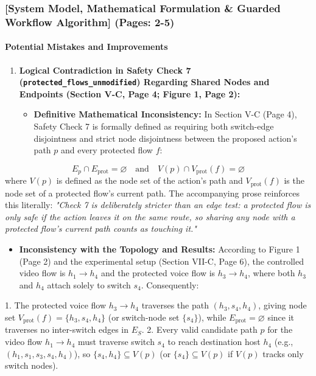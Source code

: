 \documentclass[11pt,a4paper]{article}
\begin{document}
\subsubsection*{[System Model, Mathematical Formulation \& Guarded Workflow Algorithm] (Pages: 2-5)}
\paragraph{Potential Mistakes and Improvements}
\begin{enumerate}[leftmargin=1.6em,itemsep=3pt]
\item \textbf{Logical Contradiction in Safety Check 7 (\texttt{protected\_flows\_unmodified}) Regarding Shared Nodes and Endpoints (Section V-C, Page 4; Figure 1, Page 2):}
\begin{itemize}[leftmargin=1.8em,itemsep=2pt]
\item \textbf{Definitive Mathematical Inconsistency:} In Section V-C (Page 4), Safety Check 7 is formally defined as requiring both switch-edge disjointness and strict node disjointness between the proposed action's path $p$ and every protected flow $f$:
\end{itemize}
\end{enumerate}
$$E_p \cap E_{\text{prot}} = \varnothing \quad \text{and} \quad V(p) \cap V_{\text{prot}}(f) = \varnothing$$
where $V(p)$ is defined as the node set of the action's path and $V_{\text{prot}}(f)$ is the node set of a protected flow's current path. The accompanying prose reinforces this literally: \emph{"Check 7 is deliberately stricter than an edge test: a protected flow is only safe if the action leaves it on the same route, so sharing any node with a protected flow's current path counts as touching it."}
\begin{itemize}[leftmargin=1.8em,itemsep=2pt]
\item \textbf{Inconsistency with the Topology and Results:} According to Figure 1 (Page 2) and the experimental setup (Section VII-C, Page 6), the controlled video flow is $h_1 \to h_4$ and the protected voice flow is $h_3 \to h_4$, where both $h_3$ and $h_4$ attach solely to switch $s_4$. Consequently:
\end{itemize}
1. The protected voice flow $h_3 \to h_4$ traverses the path $(h_3, s_4, h_4)$, giving node set $V_{\text{prot}}(f) = \{h_3, s_4, h_4\}$ (or switch-node set $\{s_4\}$), while $E_{\text{prot}} = \varnothing$ since it traverses no inter-switch edges in $E_S$.
2. Every valid candidate path $p$ for the video flow $h_1 \to h_4$ must traverse switch $s_4$ to reach destination host $h_4$ (e.g., $(h_1, s_1, s_3, s_4, h_4)$), so $\{s_4, h_4\} \subseteq V(p)$ (or $\{s_4\} \subseteq V(p)$ if $V(p)$ tracks only switch nodes).
\end{document}
